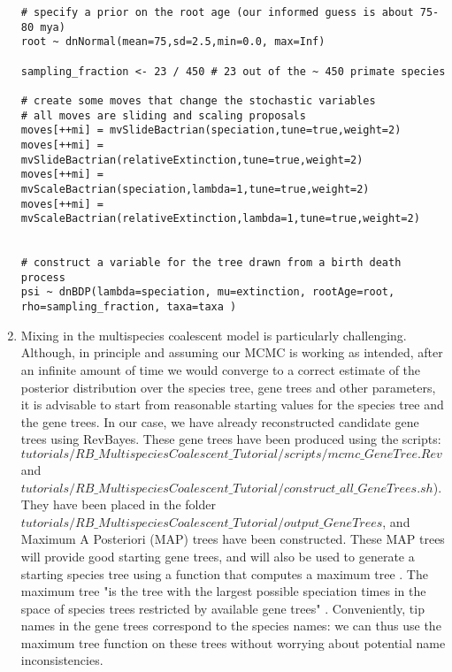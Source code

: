 \begin{enumerate}
{\begin{snugshade*}
\begin{lstlisting}
# specify a prior on the root age (our informed guess is about 75-80 mya)
root ~ dnNormal(mean=75,sd=2.5,min=0.0, max=Inf)

sampling_fraction <- 23 / 450 # 23 out of the ~ 450 primate species

# create some moves that change the stochastic variables
# all moves are sliding and scaling proposals
moves[++mi] = mvSlideBactrian(speciation,tune=true,weight=2)
moves[++mi] = mvSlideBactrian(relativeExtinction,tune=true,weight=2)
moves[++mi] = mvScaleBactrian(speciation,lambda=1,tune=true,weight=2)
moves[++mi] = mvScaleBactrian(relativeExtinction,lambda=1,tune=true,weight=2)


# construct a variable for the tree drawn from a birth death process
psi ~ dnBDP(lambda=speciation, mu=extinction, rootAge=root, rho=sampling_fraction, taxa=taxa )

\end{lstlisting}
\end{snugshade*}}

\item Mixing in the multispecies coalescent model is particularly challenging. 
Although, in principle and assuming our MCMC is working as intended, after an infinite amount of time we would converge to a correct estimate of the posterior distribution over the species tree, gene trees and other parameters, it is advisable to start from reasonable starting values for the species tree and the gene trees.
In our case, we have already reconstructed candidate gene trees using RevBayes.
These gene trees have been produced using the scripts: \\ {\footnotesize \emph{$tutorials/RB\_MultispeciesCoalescent\_Tutorial/scripts/mcmc\_GeneTree.Rev$}} and \\ {\footnotesize \emph{$tutorials/RB\_MultispeciesCoalescent\_Tutorial/construct\_all\_GeneTrees.sh$}}).
They have been placed in the folder {\footnotesize \emph{$tutorials/RB\_MultispeciesCoalescent\_Tutorial/output\_GeneTrees$}}, and Maximum A Posteriori (MAP) trees have been constructed.
These MAP trees will provide good starting gene trees, and will also be used to generate a starting species tree using a function that computes a maximum tree \citep{Edwards2007}.
The maximum tree "is the tree with the largest possible speciation times in the space of species trees restricted by available gene trees" \citep{Liu2010}.
Conveniently, tip names in the gene trees correspond to the species names: we can thus use the maximum tree function on these trees without worrying about potential name inconsistencies.


\end{enumerate}
